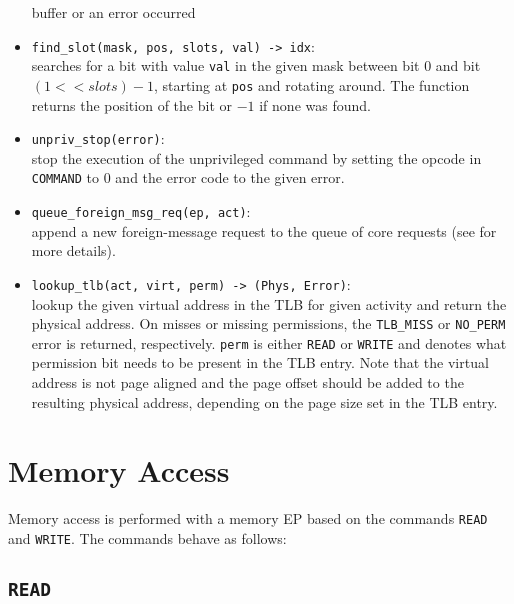 \begin{itemize}
  buffer or an error occurred
  \item \texttt{find\_slot(mask, pos, slots, val) -> idx}:\\
  searches for a bit with value \texttt{val} in the given mask between bit 0 and bit $(1 << slots) -
  1$, starting at \texttt{pos} and rotating around. The function returns the position of the bit or
  $-1$ if none was found.
  \item \texttt{unpriv\_stop(error)}:\\
  stop the execution of the unprivileged command by setting the opcode in \texttt{COMMAND} to 0 and
  the error code to the given error.
  \item \texttt{queue\_foreign\_msg\_req(ep, act)}:\\
  append a new foreign-message request to the queue of core requests (see
   for more details).\extend{}
  \item \texttt{lookup\_tlb(\colorbox{tilemux}{act, }virt, perm) -> (Phys, Error)}:\\
  lookup the given virtual address in the TLB \colorbox{tilemux}{for given activity} and return the
  physical address. On misses or missing permissions, the \texttt{TLB\_MISS} or \texttt{NO\_PERM}
  error is returned, respectively. \texttt{perm} is either \texttt{READ} or \texttt{WRITE} and denotes what permission bit needs to be present in the TLB entry. Note that the virtual address is not page aligned and the page
  offset should be added to the resulting physical address, depending on the page size set in the
  TLB entry.\extend{}
\end{itemize}

\section{Memory Access}

Memory access is performed with a memory EP based on the commands \texttt{READ} and \texttt{WRITE}.
The commands behave as follows:

\subsection{\texttt{READ}}

